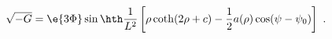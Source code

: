 \begin{equation}
\label{sqrtG}
  \sqrt{-G} = \e{3\Phi} \sin\hth \frac1{L^2}
  \left[ \rho \coth(2\rho+c) - \frac12 a(\rho) \cos(\psi-\psi_0)\right]~.
\end{equation}

